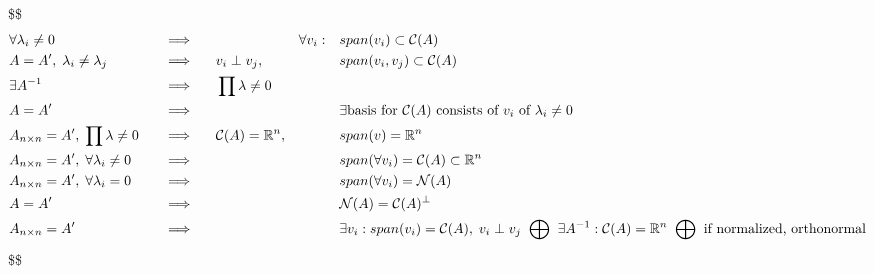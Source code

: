 \documentclass[
]{book}
\theoremstyle{definition}
\theoremstyle{definition}
\theoremstyle{definition}
\theoremstyle{definition}
\theoremstyle{remark}
\begin{document}
\$\$
\begin{alignat}{3}

&\forall \lambda_i \not = 0 
&&\; \; \; \Longrightarrow \; \; \; 
&&
&& \forall v_i : 
&& span(v_i) \subset \mathcal{C}(A)

\\

&A = A', \; \lambda_i \not = \lambda_j 
&&\; \; \; \Longrightarrow \; \; \; 
&& v_i \perp v_j,
&&
&&span(v_i, v_j) \subset \mathcal{C}(A)


\\

&\exists A^{-1} 
&&\; \; \; \Longrightarrow \; \; \; 
&& \prod \lambda\not = 0
&&
&&

\\

&A = A'
&&\; \; \; \Longrightarrow \; \; \; 
&& 
&&
&&\exists \text{basis for } \mathcal{C}(A) \text{ consists of } v_i \text{ of } \lambda_i \not = 0



\\

&A_{n \times n} = A', \; \prod \lambda \not = 0 
&&\; \; \; \Longrightarrow \; \; \; 
&& \mathcal C (A)=\mathbb R^n,
&&
&&span( v) = \mathbb{R}^n



\\

&A_{n \times n} = A', \; \forall \lambda_i \not = 0 
&&\; \; \; \Longrightarrow \; \; \; 
&& 
&&
&&span(\forall v_i) = \mathcal{C}(A) \subset \mathbb{R}^n






\\

&A_{n \times n} = A', \; \forall \lambda_i  = 0 
&&\; \; \; \Longrightarrow \; \; \; 
&& 
&&
&&span(\forall v_i) = \mathcal{N}(A)

\\

&A = A'
&&\; \; \; \Longrightarrow \; \; \; 
&& 
&&
&&\mathcal{N}(A) = \mathcal C (A)^\perp

\\

&A_{n \times n} = A'
&&\; \; \; \Longrightarrow \; \; \; 
&& 
&&
&&


\exists v_i : span(v_i) = \mathcal C (A), \; v_i \perp v_j 
\; \; \tiny {\bigoplus} \; \; \normalsize \exists A^{-1} : \mathcal C(A) = \mathbb{R}^n
\; \; \tiny {\bigoplus} \; \; \normalsize \text{if normalized, orthonormal}

\end{alignat}
\$\$
\end{document}
